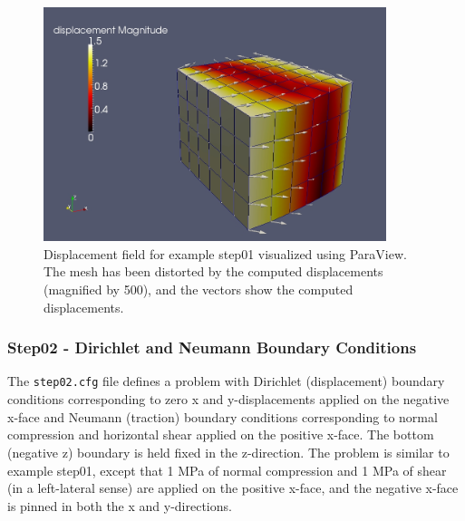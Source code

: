 \begin{figure}
\begin{centering}
\includegraphics[width=10cm]{tutorials/3dhex8/figs/step01-displ}
\par\end{centering}

\caption{Displacement field for example step01 visualized using ParaView. The
mesh has been distorted by the computed displacements (magnified by
500), and the vectors show the computed displacements.\label{fig:step01-displ}}
\end{figure}



\subsubsection{Step02 - Dirichlet and Neumann Boundary Conditions}

The \texttt{step02.cfg} file defines a problem with Dirichlet (displacement)
boundary conditions corresponding to zero x and y-displacements applied
on the negative x-face and Neumann (traction) boundary conditions
corresponding to normal compression and horizontal shear applied on
the positive x-face. The bottom (negative z) boundary is held fixed
in the z-direction. The problem is similar to example step01, except
that 1 MPa of normal compression and 1 MPa of shear (in a left-lateral
sense) are applied on the positive x-face, and the negative x-face
is pinned in both the x and y-directions.


